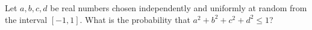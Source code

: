 Let $a,b,c,d$ be real numbers chosen independently and uniformly at random from the interval $[-1,1]$. What is the probability that $a^2+b^2+c^2+d^2\le1$?
